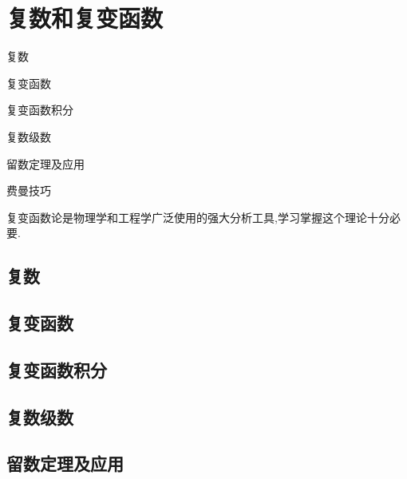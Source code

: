 


\chapter{复数和复变函数}
\begin{introduction}
\item 复数
\item 复变函数
\item 复变函数积分
\item 复数级数
\item 留数定理及应用
\item 费曼技巧
\end{introduction}

复变函数论是物理学和工程学广泛使用的强大分析工具,学习掌握这个理论十分必要.
\section{复数}

\section{复变函数}

\label{sec:complexfunctions}





\section{复变函数积分}



\section{复数级数}




% 

\section{留数定理及应用}





